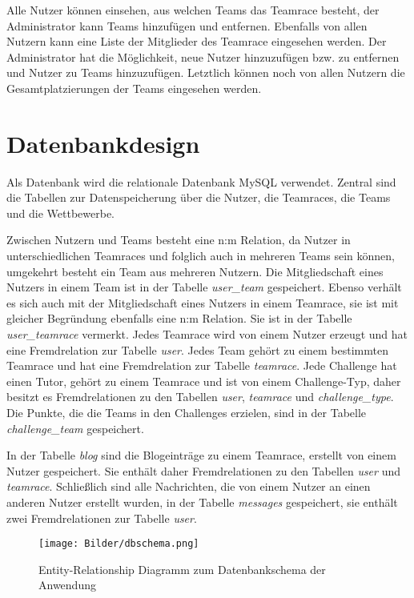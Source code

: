 \documentclass[12pt]{report}
\begin{document}
Alle Nutzer können einsehen, aus welchen Teams das Teamrace besteht, der Administrator kann Teams hinzufügen und entfernen. Ebenfalls von allen Nutzern kann eine Liste der Mitglieder des Teamrace eingesehen werden. Der Administrator hat die Möglichkeit, neue Nutzer hinzuzufügen bzw. zu entfernen und Nutzer zu Teams hinzuzufügen. Letztlich können noch von allen Nutzern die Gesamtplatzierungen der Teams eingesehen werden.

\section{Datenbankdesign}

Als Datenbank wird die relationale Datenbank MySQL verwendet. Zentral sind die Tabellen zur Datenspeicherung über die Nutzer, die Teamraces, die Teams und die Wettbewerbe. 

Zwischen Nutzern und Teams besteht eine n:m Relation, da Nutzer in unterschiedlichen Teamraces und folglich auch in mehreren Teams sein können, umgekehrt besteht ein Team aus mehreren Nutzern. Die Mitgliedschaft eines Nutzers in einem Team ist in der Tabelle \emph{user\_team} gespeichert. Ebenso verhält es sich auch mit der Mitgliedschaft eines Nutzers in einem Teamrace, sie ist mit gleicher Begründung ebenfalls eine n:m Relation. Sie ist in der Tabelle \emph{user\_teamrace} vermerkt. Jedes Teamrace wird von einem Nutzer erzeugt und hat eine Fremdrelation zur Tabelle \emph{user}. Jedes Team gehört zu einem bestimmten Teamrace und hat eine Fremdrelation zur Tabelle \emph{teamrace}. Jede Challenge hat einen Tutor, gehört zu einem Teamrace und ist von einem Challenge-Typ, daher besitzt es Fremdrelationen zu den Tabellen \emph{user}, \emph{teamrace} und \emph{challenge\_type}. Die Punkte, die die Teams in den Challenges erzielen, sind in der Tabelle \emph{challenge\_team} gespeichert.

In der Tabelle \emph{blog} sind die Blogeinträge zu einem Teamrace, erstellt von einem Nutzer gespeichert. Sie enthält daher Fremdrelationen zu den Tabellen \emph{user} und \emph{teamrace}. Schließlich sind alle Nachrichten, die von einem Nutzer an einen anderen Nutzer erstellt wurden, in der Tabelle \emph{messages} gespeichert, sie enthält zwei Fremdrelationen zur Tabelle \emph{user}.

\begin{figure}[htp]
\centering
\texttt{[image: Bilder/dbschema.png]}
\caption{Entity-Relationship Diagramm zum Datenbankschema der Anwendung}
\label{}
\end{figure}
\end{document}
